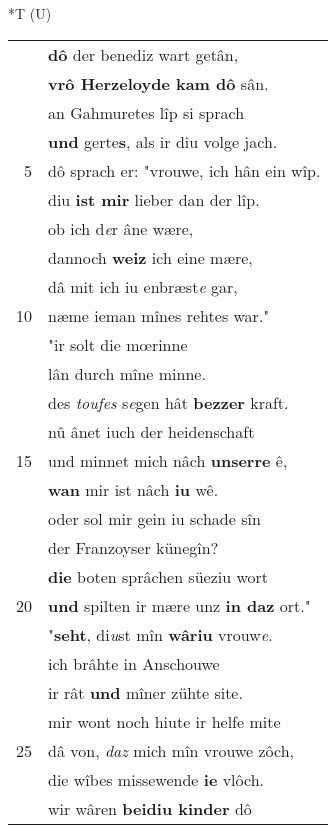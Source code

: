 \documentclass[8pt,a4paper,notitlepage]{article}
\begin{document}
\begin{table}[ht]
\begin{minipage}[t]{0.5\linewidth}
\end{minipage}
\hspace{0.5cm}
\begin{minipage}[t]{0.5\linewidth}
\small
\begin{center}*T (U)
\end{center}
\begin{tabular}{rl}
 & \textbf{dô} der benediz wart getân,\\ 
 & \textbf{vrô Herzeloyde kam dô} sân.\\ 
 & an Gahmuretes lîp si sprach\\ 
 & \textbf{und} gerte\textbf{s}, als ir diu volge jach.\\ 
5 & dô sprach er: "vrouwe, ich hân ein wîp.\\ 
 & diu \textbf{ist mir} lieber dan der lîp.\\ 
 & ob ich d\textit{e}r âne wære,\\ 
 & dannoch \textbf{weiz} ich eine mære,\\ 
 & dâ mit ich iu enbræst\textit{e} gar,\\ 
10 & næme ieman mînes rehtes war."\\ 
 & "ir solt die mœrinne\\ 
 & lân durch mîne minne.\\ 
 & des \textit{toufes} s\textit{e}gen hât \textbf{bezzer} kraft.\\ 
 & nû ânet iuch der heidenschaft\\ 
15 & und minnet mich nâch \textbf{unserre} ê,\\ 
 & \textbf{wan} mir ist nâch \textbf{iu} wê.\\ 
 & oder sol mir gein iu schade sîn\\ 
 & der Franzoyser künegîn?\\ 
 & \textbf{die} boten sprâchen süeziu wort\\ 
20 & \textbf{und} spilten ir mære unz \textbf{in daz} ort."\\ 
 & "\textbf{seht}, di\textit{u}st mîn \textbf{wâriu} vrouw\textit{e}.\\ 
 & ich brâhte in Anschouwe\\ 
 & ir rât \textbf{und} mîner zühte site.\\ 
 & mir wont noch hiute ir helfe mite\\ 
25 & dâ von, \textit{daz} mich mîn vrouwe zôch,\\ 
 & die wîbes missewende \textbf{ie} vlôch.\\ 
 & wir wâren \textbf{beidiu kinder} dô\\ 

\end{tabular}
\end{minipage}
\end{table}
\end{document}
